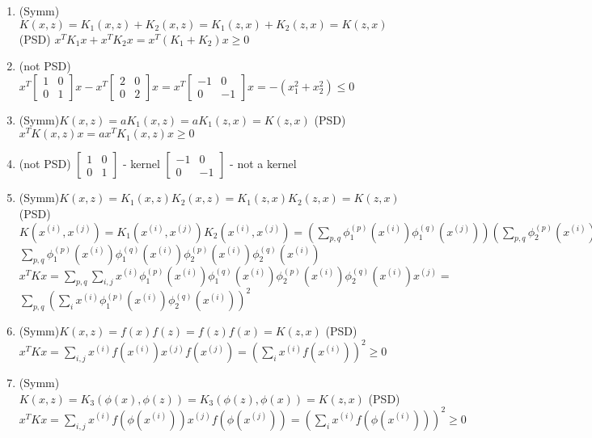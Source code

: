 \begin{answer}
\centering
\begin{enumerate}
\item
\subitem  (Symm)$K(x,z) = K_1(x,z) + K_2(x,z) = K_1(z,x) + K_2(z,x) = K(z,x)$
\subitem (PSD) $x^TK_1x + x^TK_2x = x^T(K_1 + K_2)x \ge 0$ 
\item (not PSD) $
x^T
\begin{bmatrix}
    1  & 0 \\
    0  & 1
\end{bmatrix} x - 
x^T
\begin{bmatrix}
    2  & 0 \\
    0  & 2
\end{bmatrix} x =
x^T
\begin{bmatrix}
    -1  & 0 \\
    0  & -1
\end{bmatrix} x =
- (x_1^2 + x_2^2) \le 0
$
\item 
\subitem  (Symm)$K(x,z) = a K_1(x,z) = a K_1(z,x) = K(z,x)$
\subitem (PSD) $x^TK(x,z)x = a x^TK_1(x,z)x \ge 0$
\item (not PSD) 
$
\begin{bmatrix}
    1  & 0 \\
    0  & 1
\end{bmatrix} 
$ - kernel
$
\begin{bmatrix}
    -1  & 0 \\
    0  & -1
\end{bmatrix} 
$ - not a kernel
\item
\subitem  (Symm)$K(x,z) = K_1(x,z)K_2(x,z) =  K_1(z,x)K_2(z,x)= K(z,x)$
\subitem (PSD) $K(x^{(i)}, x^{(j)}) =K_1(x^{(i)}, x^{(j)})K_2(x^{(i)}, x^{(j)}) = (\sum_{p, q} \phi_1^{(p)}(x^{(i)}) \phi_1^{(q)}(x^{(j)}))  (\sum_{p, q} \phi_2^{(p)}(x^{(i)}) \phi_2^{(q)}(x^{(j)})) =$
$\sum_{p, q} \phi_1^{(p)}(x^{(i)}) \phi_1^{(q)}(x^{(i)}) \phi_2^{(p)}(x^{(i)}) \phi_2^{(q)}(x^{(i)})$ 
$x^TKx = \sum_{p, q}  \sum_{i, j} x^{(i)} \phi_1^{(p)}(x^{(i)}) \phi_1^{(q)}(x^{(i)}) \phi_2^{(p)}(x^{(i)}) \phi_2^{(q)}(x^{(i)}) x^{(j)} =$
$\sum_{p, q} (\sum_{i} x^{(i)} \phi_1^{(p)}(x^{(i)}) \phi_2^{(q)}(x^{(i)}))^2$
\item 
\subitem  (Symm)$K(x,z) = f(x) f(z) = f(z) f(x) = K(z,x)$
\subitem (PSD) $x^TKx = \sum_{i, j} x^{(i)} f(x^{(i)}) x^{(j)} f(x^{(j)}) = (\sum_{i}x^{(i)} f(x^{(i)}) )^2 \ge 0$
\item
\subitem  (Symm) $K(x,z) = K_3(\phi(x), \phi(z)) = K_3(\phi(z), \phi(x)) = K(z,x)$
\subitem (PSD) $x^TKx = \sum_{i, j} x^{(i)} f(\phi(x^{(i)})) x^{(j)} f(\phi(x^{(j)})) = (\sum_{i}x^{(i)} f(\phi(x^{(i)})) )^2 \ge 0$

\end{enumerate}
\end{answer}
